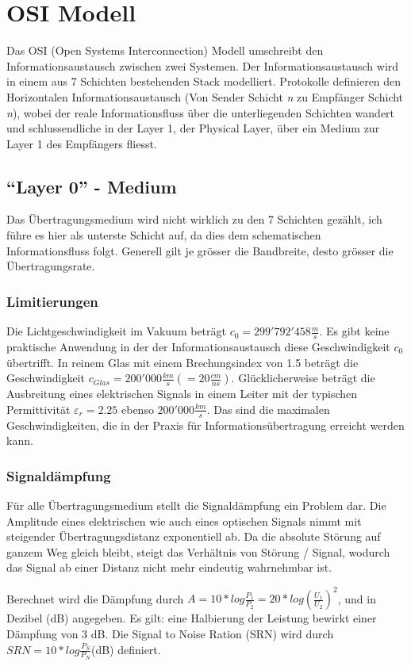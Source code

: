 \documentclass{article}
\author{Philipp Kiss}
\begin{document}
\section{OSI Modell}
Das OSI (Open Systems Interconnection) Modell umschreibt den Informationsaustausch zwischen zwei Systemen. Der Informationsaustausch wird in einem aus 7 Schichten bestehenden Stack modelliert. Protokolle definieren den Horizontalen Informationsaustausch (Von Sender Schicht \textit{n} zu Empfänger Schicht \textit{n}), wobei der reale Informationsfluss über die unterliegenden Schichten wandert und schlussendliche in der Layer 1, der Physical Layer, über ein Medium zur Layer 1 des Empfängers fliesst.
\subsection{``Layer 0'' - Medium}
Das Übertragungsmedium wird nicht wirklich zu den 7 Schichten gezählt, ich führe es hier als unterste Schicht auf, da dies dem schematischen Informationsfluss folgt. Generell gilt je grösser die Bandbreite, desto grösser die Übertragungsrate.
\subsubsection{Limitierungen}
Die Lichtgeschwindigkeit im Vakuum beträgt $c_0 = 299'792'458 \frac{m}{s} $. Es gibt keine praktische Anwendung in der der Informationsaustausch diese Geschwindigkeit $c_0$ übertrifft. In reinem Glas mit einem Brechungsindex von 1.5 beträgt die Geschwindigkeit $c_{Glas} = 200'000 \frac{km}{s} \left(= 20 \frac{cm}{ns} \right)$. Glücklicherweise beträgt die Ausbreitung eines elektrischen Signals in einem Leiter mit der typischen Permittivität $\varepsilon_r = 2.25$ ebenso $200'000 \frac{km}{s}$. Das sind die maximalen Geschwindigkeiten, die in der Praxis für Informationsübertragung erreicht werden kann.
\subsubsection{Signaldämpfung}
Für alle Übertragungsmedium stellt die Signaldämpfung ein Problem dar. Die Amplitude eines elektrischen wie auch eines optischen Signals nimmt mit steigender Übertragungsdistanz exponentiell ab. Da die absolute Störung auf ganzem Weg gleich bleibt, steigt das Verhältnis von Störung / Signal, wodurch das Signal ab einer Distanz nicht mehr eindeutig wahrnehmbar ist.

Berechnet wird die Dämpfung durch $A = 10 * log \frac{P_1}{P_2} = 20 * log \left(\frac{U_1}{U_2}\right)^{2}$, und in Dezibel (dB) angegeben. Es gilt: eine Halbierung der Leistung bewirkt einer Dämpfung von 3 dB.
Die Signal to Noise Ration (SRN) wird durch $SRN = 10 * log \frac{P_{S}}{P_N} $(dB) definiert.
\newpage
\end{document}
